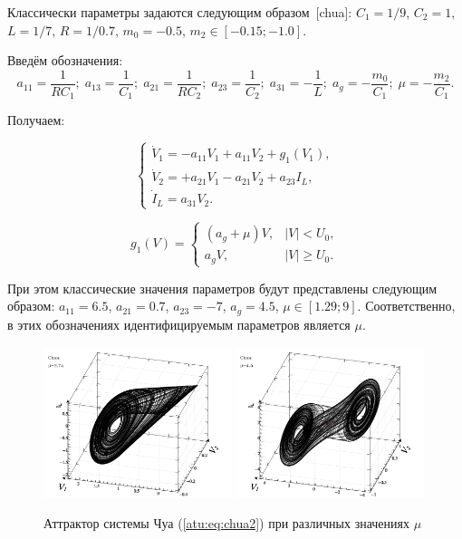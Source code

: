 \documentclass[a4paper,12pt]{article}
\begin{document}

Классически параметры задаются следующим образом~[chua]:
$C_1 = 1/9$, $C_2 = 1$, $L= 1/7$, $R = 1/0.7$, $m_0=-0.5$, $ m_2 \in [ -0.15; -1.0 ] $.

Введём обозначения:
\[
  a_{11} = \frac{1}{R C_1}; \;
  a_{13} = \frac{1}{C_1}; \;
  a_{21} = \frac{1}{R C_2}; \;
  a_{23} = \frac{1}{C_2}; \;
  a_{31} = -\frac{1}{L}; \;
  a_g = - \frac{m_0}{C_1}; \;
  \mu = - \frac{m_2}{C_1}.
\]

\noindent
Получаем:

\begin{equation}
\begin{cases}
  \dot{V}_1  = -a_{11} V_1 + a_{11}  V_2  + g_1(V_1) , \\
  \dot{V}_2  = +a_{21} V_1 - a_{21}  V_2  + a_{23} I_L    , \\
  \dot{I}_L  =  a_{31} V_2.
\end{cases}
\label{atu:eq:chua2}
\end{equation}


\begin{equation}
g_1(V) =
\begin{cases}
  ( a_g + \mu ) V , & |V| <   U_0, \\
  a_g V           , & |V| \ge U_0.
\end{cases}
\label{atu:eq:diodchua2}
\end{equation}

При этом классические значения параметров будут представлены следующим образом:
$ a_{11} = 6.5 $, $a_{21} = 0.7$, $ a_{23} = -7 $, $ a_g = 4.5 $,
$ \mu \in [ 1.29 ; 9 ] $.
Соответственно, в этих обозначениях
идентифицируемым параметров является $\mu$.



\begin{figure}[htb!]
\centerline{
  \includegraphics[width=0.49\textwidth]{p/cha/chua/chua_1-p_xyz_mu=2x74.png}
  \includegraphics[width=0.49\textwidth]{p/cha/chua/chua_1-p_xyz_mu=4x50.png}
}
\caption{Аттрактор системы Чуа (\ref{atu:eq:chua2}) при различных значениях $\mu$}
\label{atu:f:chua_phase}
\end{figure}
\end{document}
